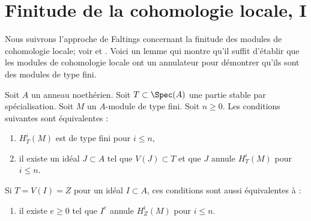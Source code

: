 \section{Finitude de la cohomologie locale, I}
\label{section-finiteness}

\noindent
Nous suivrons l'approche de Faltings concernant la finitude des modules de
cohomologie locale; voir \cite{Faltings-annulators} et \cite{Faltings-finiteness}.
Voici un lemme qui montre qu'il suffit d'établir que les modules de
cohomologie locale ont un annulateur pour démontrer qu'ils
sont des modules de type fini.

\begin{lemma}
\label{lemma-check-finiteness-local-cohomology-by-annihilator}
\begin{reference}
\cite[Lemma 3]{Faltings-annulators}
\end{reference}
Soit $A$ un anneau noethérien. Soit $T \subset \Spec(A)$ une partie stable
par spécialisation. Soit $M$ un $A$-module de type fini. Soit $n \geq 0$.
Les conditions suivantes sont équivalentes :
\begin{enumerate}
\item $H^i_T(M)$ est de type fini pour $i \leq n$,
\item il existe un idéal $J \subset A$ tel que $V(J) \subset T$
et que $J$ annule $H^i_T(M)$ pour $i \leq n$.
\end{enumerate}
Si $T = V(I) = Z$ pour un idéal $I \subset A$, ces conditions sont aussi
équivalentes à :
\begin{enumerate}
\item[(3)] il existe $e \geq 0$ tel que $I^e$ annule
$H^i_Z(M)$ pour $i \leq n$.
\end{enumerate}
\end{lemma}

